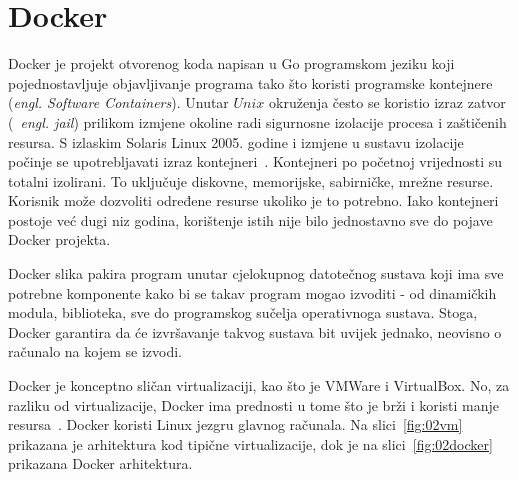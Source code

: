 \section{Docker}
Docker je projekt otvorenog koda napisan u Go programskom jeziku koji pojednostavljuje objavljivanje
programa tako što koristi programske kontejnere (\textit{engl. Software Containers}). Unutar $Unix$
okruženja često se koristio izraz zatvor (~\textit{engl. jail}) prilikom izmjene okoline radi
sigurnosne izolacije procesa i zaštičenih resursa. S izlaskim Solaris Linux 2005. godine i izmjene u
sustavu izolacije počinje se upotrebljavati izraz kontejneri~\citep{nickoloff2016docker}. Kontejneri
po početnoj vrijednosti su totalni izolirani. To uključuje diskovne, memorijske, sabirničke, mrežne
resurse. Korisnik može dozvoliti određene resurse ukoliko je to potrebno. Iako kontejneri postoje
već dugi niz godina, korištenje istih nije bilo jednostavno sve do pojave Docker projekta.

Docker slika pakira program unutar cjelokupnog datotečnog sustava koji ima sve potrebne komponente
kako bi se takav program mogao izvoditi - od dinamičkih modula, biblioteka, sve do programskog
sučelja operativnoga sustava. Stoga, Docker garantira da će izvršavanje takvog sustava bit uvijek
jednako, neovisno o računalo na kojem se izvodi.

Docker je konceptno sličan virtualizaciji, kao što je VMWare i VirtualBox. No, za razliku od
virtualizacije, Docker ima prednosti u tome što je brži i koristi manje
resursa~\citep{leszko2017continuous}. Docker koristi Linux jezgru glavnog računala. Na
slici~\ref{fig:02vm} prikazana je arhitektura kod tipične virtualizacije, dok je na
slici~\ref{fig:02docker} prikazana Docker arhitektura.

